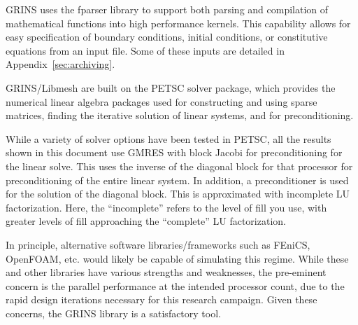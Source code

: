 
GRINS uses the fparser\cite{fparser}
library to support both parsing and compilation of mathematical
functions into high performance kernels. This capability allows for
easy specification of boundary conditions, initial conditions, or
constitutive equations from an input file. Some of these inputs are
detailed in Appendix~\ref{sec:archiving}. 

GRINS/Libmesh are built on the PETSC\cite{petsc} solver package, which
provides the numerical linear algebra packages used for constructing and
using sparse matrices, finding the iterative solution of linear systems,
and for preconditioning.  

While a variety of solver options have been tested in PETSC, all the
results shown in this document use GMRES with block Jacobi for
preconditioning\cite{Saad:2003} for the linear solve. This uses the
inverse of the diagonal block for that processor for preconditioning of
the entire linear system. In addition, a preconditioner is used for the
solution of the diagonal block. This is approximated with incomplete LU
factorization\cite{?}. Here, the ``incomplete'' refers
to the level of fill you use, with greater levels of fill approaching
the ``complete'' LU factorization. 

In principle, alternative software libraries/frameworks such as
FEniCS\cite{fenics}, OpenFOAM\cite{openfoam}, etc. would likely be
capable of simulating this regime. While these and other libraries have
various strengths and weaknesses, the pre-eminent concern is the parallel
performance at the intended processor count, due to the rapid
design iterations necessary for this research campaign. Given these concerns,
the GRINS library is a satisfactory tool. 

